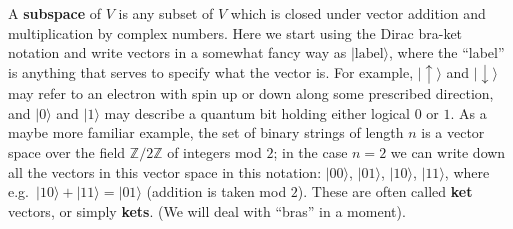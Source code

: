 \documentclass[fleqn,a4paper]{article}
\theoremstyle{definition}
\theoremstyle{definition}
\theoremstyle{definition}
\theoremstyle{definition}
\theoremstyle{remark}
\begin{document}
A \textbf{subspace} of \(V\) is any subset of \(V\) which is closed under vector addition and multiplication by complex numbers.
Here we start using the Dirac bra-ket notation and write vectors in a somewhat fancy way as \(|\text{label}\rangle\), where the ``label'' is anything that serves to specify what the vector is.
For example, \(|\uparrow\rangle\) and \(|\downarrow\rangle\) may refer to an electron with spin up or down along some prescribed direction, and \(|0\rangle\) and \(|1\rangle\) may describe a quantum bit holding either logical \(0\) or \(1\).
As a maybe more familiar example, the set of binary strings of length \(n\) is a vector space over the field \(\mathbb{Z}/2\mathbb{Z}\) of integers mod \(2\); in the case \(n=2\) we can write down all the vectors in this vector space in this notation: \(|00\rangle\), \(|01\rangle\), \(|10\rangle\), \(|11\rangle\), where e.g.~\(|10\rangle+|11\rangle=|01\rangle\) (addition is taken mod \(2\)).
These are often called \textbf{ket} vectors, or simply \textbf{kets}.
(We will deal with ``bras'' in a moment).
\end{document}
